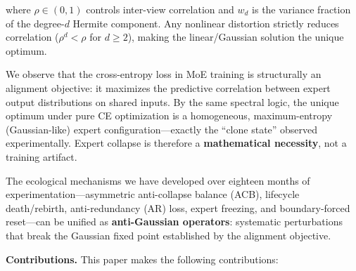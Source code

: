\documentclass[twoside]{article}
\theoremstyle{definition}
\begin{document}
where $\rho \in (0,1)$ controls inter-view correlation and $w_d$ is the variance fraction of the degree-$d$ Hermite component. Any nonlinear distortion strictly reduces correlation ($\rho^d < \rho$ for $d \geq 2$), making the linear/Gaussian solution the unique optimum.

We observe that the cross-entropy loss in MoE training is structurally an alignment objective: it maximizes the predictive correlation between expert output distributions on shared inputs. By the same spectral logic, the unique optimum under pure CE optimization is a homogeneous, maximum-entropy (Gaussian-like) expert configuration---exactly the ``clone state'' observed experimentally. Expert collapse is therefore a \textbf{mathematical necessity}, not a training artifact.

The ecological mechanisms we have developed over eighteen months of experimentation---asymmetric anti-collapse balance (ACB), lifecycle death/rebirth, anti-redundancy (AR) loss, expert freezing, and boundary-forced reset---can be unified as \textbf{anti-Gaussian operators}: systematic perturbations that break the Gaussian fixed point established by the alignment objective.

\textbf{Contributions.} This paper makes the following contributions:
\end{document}
